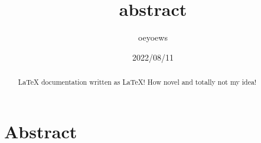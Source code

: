 \documentclass[UTF8]{ctexart}
\title{abstract}
\author{oeyoews}
\date{2022/08/11}
\begin{document}
\maketitle

\section{Abstract}%
\label{sec:Abstract}

\begin{abstract}
	\LaTeX{} documentation written as \LaTeX! How novel and totally not
	my idea!
\end{abstract}
\end{document}
